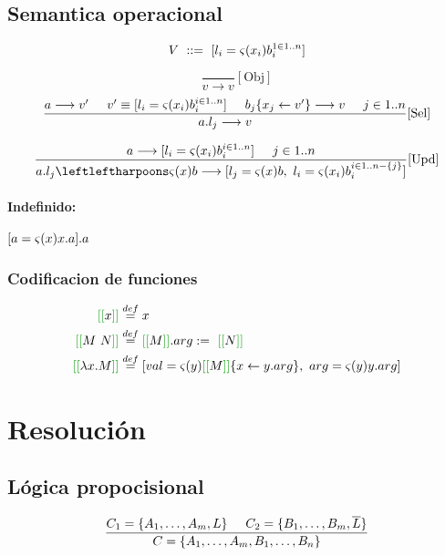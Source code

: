 \documentclass[10pt,a4paper]{article}
\begin{document}
\subsection{Semantica operacional}
$$V~::=~[l_i = \varsigma(x_i)b_i^{1\in 1..n}]$$

$$\frac{}{v\longrightarrow v}[\text{Obj}]$$
\vspace*{5mm}
$$\frac{a\longrightarrow v'\hspace*{5mm} v'\equiv [l_i = \varsigma(x_i)b_i^{i\in 1..n}]\hspace*{5mm} b_j\{x_j\leftarrow v'\}\longrightarrow v\hspace*{5mm} j\in1..n}{a.l_j\longrightarrow v}[\text{Sel}]$$

\vspace*{5mm}
$$\frac{a\longrightarrow [\OOAtributo{l_i}{x_i}{b_i}^{i\in 1..n}]\hspace*{5mm} j\in1..n}{\OORedefinicion{a.l_j}{x}{b}\longrightarrow [\OOAtributo{l_j}{x}{b},~\OOAtributo{l_i}{x_i}{b_i}^{i\in 1..n-\{j\}}]}[\text{Upd}]$$

\paragraph{Indefinido: } $[a = \varsigma(x)x.a].a$

\subsubsection{Codificacion de funciones}
\begin{align*}
\OORep{x} &\equalDef x\\
\OORep{M~N} &\equalDef \OORep{M}.arg :=~\OORep{N}\\
\OORep{\lambdaAbsI{x}{M}} &\equalDef 
[\OOAtributo{val}{y}{\OORep{M}\{x\leftarrow y.arg\}},~\OOAtributo{arg}{y}{y.arg}]\\
\end{align*}


\newpage
\section{Resolución}
\subsection{Lógica propocisional}
$$\frac{C_1 = \{A_1,\dots,A_m,L\}\hspace*{5mm} C_2 = \{B_1,\dots,B_m, \overline{L}\}}{C = \{A_1,\dots,A_m, B_1,\dots,B_n\}}$$
\end{document}
